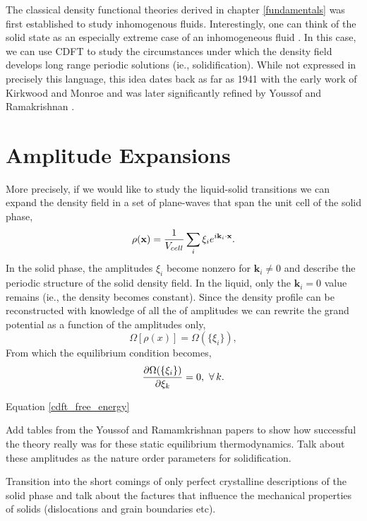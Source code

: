 The classical density functional theories derived in chapter \ref{fundamentals}
was first established to study inhomogenous fluids.  Interestingly, one can
think of the solid state as an especially extreme case of an inhomogeneous
fluid \cite{HANSEN-CH6}.  In this case, we can use CDFT to study the
circumstances under which the density field develops long range periodic
solutions (ie., solidification).  While not expressed in precisely this
language, this idea dates back as far as 1941 with the early work of Kirkwood
and Monroe \cite{KIRKWOOD_MONROE41} and was later significantly refined by
Youssof and Ramakrishnan \cite{RAMAKRISHNAN79}.

\section{Amplitude Expansions} %

More precisely, if we would like to study the liquid-solid transitions we can
expand the density field in a set of plane-waves that span the unit cell of the
solid phase,
%
\begin{equation} \rho(\mathbf{x}) = \frac{1}{V_{cell}} \sum_i \xi_i e^{i
\mathbf{k}_i \cdot \mathbf{x}}.  \end{equation}
%
In the solid phase, the amplitudes $\xi_i$ become nonzero for $\mathbf{k}_i \ne
0$ and describe the periodic structure of the solid density field.  In the
liquid, only the $\mathbf{k}_i = 0$ value remains (ie., the density becomes
constant).  Since the density profile can be reconstructed with knowledge of
all the of amplitudes we can rewrite the grand potential as a function of the
amplitudes only, 
%
\begin{equation} \Omega[\rho(x)] = \Omega(\lbrace\xi_i\rbrace), \end{equation}
%
From which the equilibrium condition becomes,
%
\begin{equation} \frac{\partial \Omega(\lbrace\xi_i\rbrace)}{\partial \xi_k} = 0,
\,\,\forall \,k.  \end{equation}
%

Equation \ref{cdft_free_energy}
{\color{ForestGreen} { \bfseries
    
    Add tables from the Youssof and Ramamkrishnan papers to show how successful
    the theory really was for these static equilibrium thermodynamics. Talk
    about these amplitudes as the nature order parameters for solidification.
    
    Transition into the short comings of only perfect crystalline descriptions
    of the solid phase and talk about the factures that influence the
    mechanical properties of solids (dislocations and grain boundaries etc).}
}

